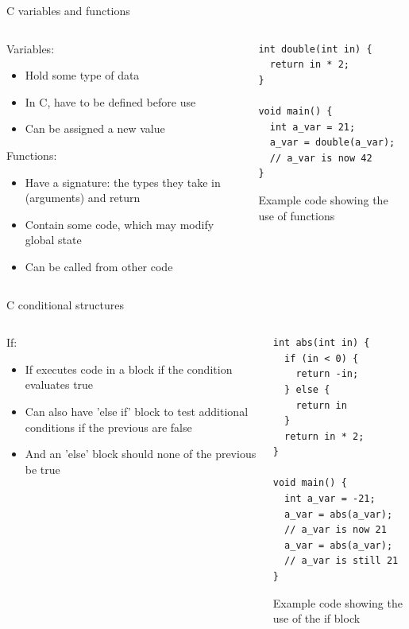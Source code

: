 \documentclass{beamer}
\begin{document}
\begin{frame}[fragile]{C variables and functions}
  \begin{columns}[T]
    \begin{column}{.6\textwidth}
      Variables:
      \begin{itemize}
        \item Hold some type of data
        \item In C, have to be defined before use
        \item Can be assigned a new value
      \end{itemize}
      Functions:
      \begin{itemize}
        \item Have a signature: the types they take in (arguments) and return
        \item Contain some code, which may modify global state
        \item Can be called from other code
      \end{itemize}
    \end{column}

    \begin{column}{0.4\textwidth} \centering
\begin{lstlisting}[tabsize=2,basicstyle=\ttfamily\scriptsize]
int double(int in) {
  return in * 2;
}

void main() {
  int a_var = 21;
  a_var = double(a_var);
  // a_var is now 42
} \end{lstlisting} 
Example code showing the use of functions
    \end{column}
  \end{columns}
\end{frame}

\begin{frame}[fragile]{C conditional structures}
  \begin{columns}[T]
    \begin{column}{.6\textwidth}
      If:
      \begin{itemize}
        \item If executes code in a block if the condition evaluates true
        \item Can also have 'else if' block to test additional conditions if the previous are false
        \item And an 'else' block should none of the previous be true
      \end{itemize}
    \end{column}

    \begin{column}{0.4\textwidth}
\begin{lstlisting}[tabsize=2,basicstyle=\ttfamily\scriptsize]
int abs(int in) {
  if (in < 0) {
    return -in;
  } else {
    return in
  }
  return in * 2;
}

void main() {
  int a_var = -21;
  a_var = abs(a_var);
  // a_var is now 21
  a_var = abs(a_var);
  // a_var is still 21
} \end{lstlisting} 
Example code showing the use of the if block
    \end{column}
  \end{columns}
\end{frame}
\end{document}
